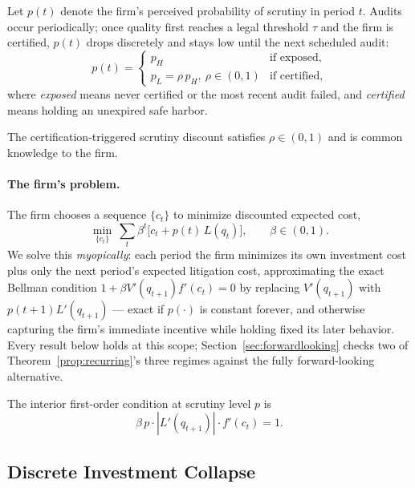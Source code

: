 Let $p(t)$ denote the firm's perceived probability of scrutiny in period $t$. Audits occur periodically; once quality first reaches a legal threshold $\tau$ and the firm is certified, $p(t)$ drops discretely and stays low until the next scheduled audit:
\begin{equation}
p(t) =
\begin{cases}
p_H & \text{if exposed,} \\
p_L = \rho\, p_H, \ \rho \in (0,1) & \text{if certified,}
\end{cases}
\label{eq:pt}
\end{equation}
where \emph{exposed} means never certified or the most recent audit failed, and \emph{certified} means holding an unexpired safe harbor.

\begin{assumption}
The certification-triggered scrutiny discount satisfies $\rho \in (0,1)$ and is common knowledge to the firm.
\label{as:rho}
\end{assumption}

\paragraph{The firm's problem.} The firm chooses a sequence $\{c_t\}$ to minimize discounted expected cost,
\begin{equation}
\min_{\{c_t\}} \ \sum_{t} \beta^t \Big[ c_t + p(t)\, L(q_t) \Big], \qquad \beta \in (0,1).
\label{eq:objective}
\end{equation}
We solve this \emph{myopically}: each period the firm minimizes its own investment cost plus only the next period's expected litigation cost, approximating the exact Bellman condition $1+\beta V'(q_{t+1})f'(c_t)=0$ by replacing $V'(q_{t+1})$ with $p(t{+}1)L'(q_{t+1})$ — exact if $p(\cdot)$ is constant forever, and otherwise capturing the firm's immediate incentive while holding fixed its later behavior. Every result below holds at this scope; Section~\ref{sec:forwardlooking} checks two of Theorem~\ref{prop:recurring}'s three regimes against the fully forward-looking alternative.

The interior first-order condition at scrutiny level $p$ is
\begin{equation}
\beta\, p \cdot |L'(q_{t+1})| \cdot f'(c_t) = 1.
\label{eq:foc}
\end{equation}

\subsection{Discrete Investment Collapse}

